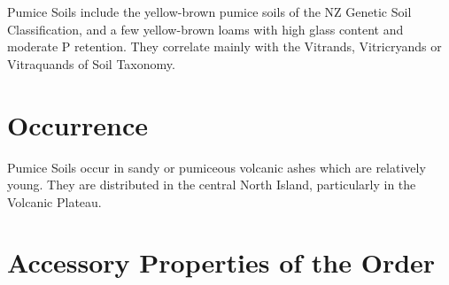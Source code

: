 \documentclass[
  letterpaper,
  DIV=11,
  numbers=noendperiod]{scrreprt}
\begin{document}
Pumice Soils include the yellow-brown pumice soils of the NZ Genetic
Soil Classification, and a few yellow-brown loams with high glass
content and moderate P retention. They correlate mainly with the
Vitrands, Vitricryands or Vitraquands of Soil Taxonomy.

\hypertarget{sec-occ-M}{%
\section{Occurrence}\label{sec-occ-M}}

Pumice Soils occur in sandy or pumiceous volcanic ashes which are
relatively young. They are distributed in the central North Island,
particularly in the Volcanic Plateau.

\hypertarget{sec-acc-M}{%
\section{Accessory Properties of the Order}\label{sec-acc-M}}
\end{document}
